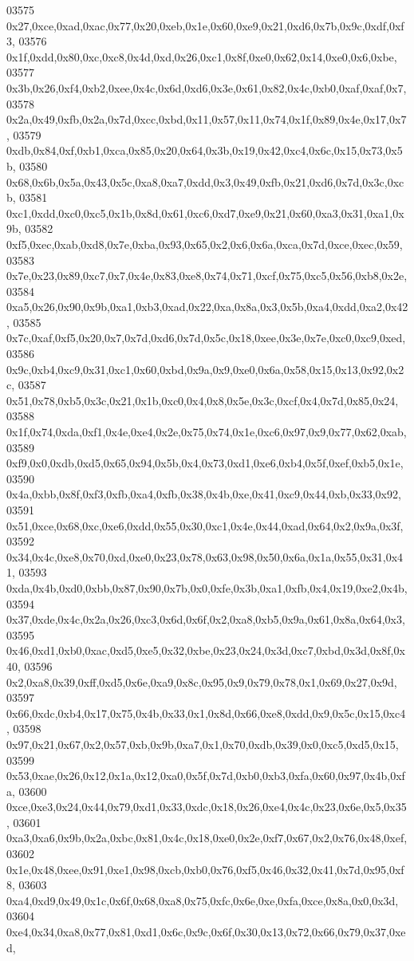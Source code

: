\begin{DoxyCode}
03575   0x27,0xce,0xad,0xac,0x77,0x20,0xeb,0x1e,0x60,0xe9,0x21,0xd6,0x7b,0x9c,0xdf,0xf3,
03576   0x1f,0xdd,0x80,0xc,0xc8,0x4d,0xd,0x26,0xc1,0x8f,0xe0,0x62,0x14,0xe0,0x6,0xbe,
03577   0x3b,0x26,0xf4,0xb2,0xee,0x4c,0x6d,0xd6,0x3e,0x61,0x82,0x4c,0xb0,0xaf,0xaf,0x7,
03578   0x2a,0x49,0xfb,0x2a,0x7d,0xcc,0xbd,0x11,0x57,0x11,0x74,0x1f,0x89,0x4e,0x17,0x7,
03579   0xdb,0x84,0xf,0xb1,0xca,0x85,0x20,0x64,0x3b,0x19,0x42,0xc4,0x6c,0x15,0x73,0x5b,
03580   0x68,0x6b,0x5a,0x43,0x5c,0xa8,0xa7,0xdd,0x3,0x49,0xfb,0x21,0xd6,0x7d,0x3c,0xcb,
03581   0xc1,0xdd,0xc0,0xc5,0x1b,0x8d,0x61,0xc6,0xd7,0xe9,0x21,0x60,0xa3,0x31,0xa1,0x9b,
03582   0xf5,0xec,0xab,0xd8,0x7e,0xba,0x93,0x65,0x2,0x6,0x6a,0xca,0x7d,0xce,0xec,0x59,
03583   0x7e,0x23,0x89,0xc7,0x7,0x4e,0x83,0xe8,0x74,0x71,0xcf,0x75,0xc5,0x56,0xb8,0x2e,
03584   0xa5,0x26,0x90,0x9b,0xa1,0xb3,0xad,0x22,0xa,0x8a,0x3,0x5b,0xa4,0xdd,0xa2,0x42,
03585   0x7c,0xaf,0xf5,0x20,0x7,0x7d,0xd6,0x7d,0x5c,0x18,0xee,0x3e,0x7e,0xc0,0xc9,0xed,
03586   0x9c,0xb4,0xc9,0x31,0xc1,0x60,0xbd,0x9a,0x9,0xe0,0x6a,0x58,0x15,0x13,0x92,0x2c,
03587   0x51,0x78,0xb5,0x3c,0x21,0x1b,0xc0,0x4,0x8,0x5e,0x3c,0xcf,0x4,0x7d,0x85,0x24,
03588   0x1f,0x74,0xda,0xf1,0x4e,0xe4,0x2e,0x75,0x74,0x1e,0xc6,0x97,0x9,0x77,0x62,0xab,
03589   0xf9,0x0,0xdb,0xd5,0x65,0x94,0x5b,0x4,0x73,0xd1,0xe6,0xb4,0x5f,0xef,0xb5,0x1e,
03590   0x4a,0xbb,0x8f,0xf3,0xfb,0xa4,0xfb,0x38,0x4b,0xe,0x41,0xc9,0x44,0xb,0x33,0x92,
03591   0x51,0xce,0x68,0xc,0xe6,0xdd,0x55,0x30,0xc1,0x4e,0x44,0xad,0x64,0x2,0x9a,0x3f,
03592   0x34,0x4c,0xe8,0x70,0xd,0xe0,0x23,0x78,0x63,0x98,0x50,0x6a,0x1a,0x55,0x31,0x41,
03593   0xda,0x4b,0xd0,0xbb,0x87,0x90,0x7b,0x0,0xfe,0x3b,0xa1,0xfb,0x4,0x19,0xe2,0x4b,
03594   0x37,0xde,0x4c,0x2a,0x26,0xc3,0x6d,0x6f,0x2,0xa8,0xb5,0x9a,0x61,0x8a,0x64,0x3,
03595   0x46,0xd1,0xb0,0xac,0xd5,0xe5,0x32,0xbe,0x23,0x24,0x3d,0xc7,0xbd,0x3d,0x8f,0x40,
03596   0x2,0xa8,0x39,0xff,0xd5,0x6e,0xa9,0x8c,0x95,0x9,0x79,0x78,0x1,0x69,0x27,0x9d,
03597   0x66,0xdc,0xb4,0x17,0x75,0x4b,0x33,0x1,0x8d,0x66,0xe8,0xdd,0x9,0x5c,0x15,0xc4,
03598   0x97,0x21,0x67,0x2,0x57,0xb,0x9b,0xa7,0x1,0x70,0xdb,0x39,0x0,0xc5,0xd5,0x15,
03599   0x53,0xae,0x26,0x12,0x1a,0x12,0xa0,0x5f,0x7d,0xb0,0xb3,0xfa,0x60,0x97,0x4b,0xfa,
03600   0xce,0xe3,0x24,0x44,0x79,0xd1,0x33,0xdc,0x18,0x26,0xe4,0x4c,0x23,0x6e,0x5,0x35,
03601   0xa3,0xa6,0x9b,0x2a,0xbc,0x81,0x4c,0x18,0xe0,0x2e,0xf7,0x67,0x2,0x76,0x48,0xef,
03602   0x1e,0x48,0xee,0x91,0xe1,0x98,0xcb,0xb0,0x76,0xf5,0x46,0x32,0x41,0x7d,0x95,0xf8,
03603   0xa4,0xd9,0x49,0x1c,0x6f,0x68,0xa8,0x75,0xfc,0x6e,0xe,0xfa,0xce,0x8a,0x0,0x3d,
03604   0xe4,0x34,0xa8,0x77,0x81,0xd1,0x6c,0x9c,0x6f,0x30,0x13,0x72,0x66,0x79,0x37,0xed,

\end{DoxyCode}
